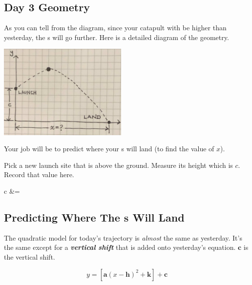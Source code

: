 \subsection{Day 3 Geometry}

As you can tell from the diagram, 
since your catapult with be higher than yesterday,
the \mymm{}s will go further.
Here is a detailed diagram of the geometry.
\begin{center}
    \includegraphics[width=2.5in]{../day3-geometry.jpg}
\end{center}

Your job will be to predict where your \mymm{}s will land
(to find the value of $x$).

Pick a new launch site that is above the ground.
Measure its height which is $c$.
Record that value here.

\begin{tcolorbox}[colback=\myFillinColor,ams align]
    \label{c-value}
    c &= 
\end{tcolorbox}





\subsection{Predicting Where The \mymm{}s Will Land}

The quadratic model for today's trajectory 
is {\itshape almost} the same as yesterday.
It's the same except for a {\bfseries\itshape vertical shift} that is added onto yesterday's equation.
$\bm{c}$ is the vertical shift.

\begin{equation}\label{shifted-model}
    y = \left[\bm{a}(x-\bm{h})^2 + \bm{k}\right] + \bm{c}
\end{equation} 

